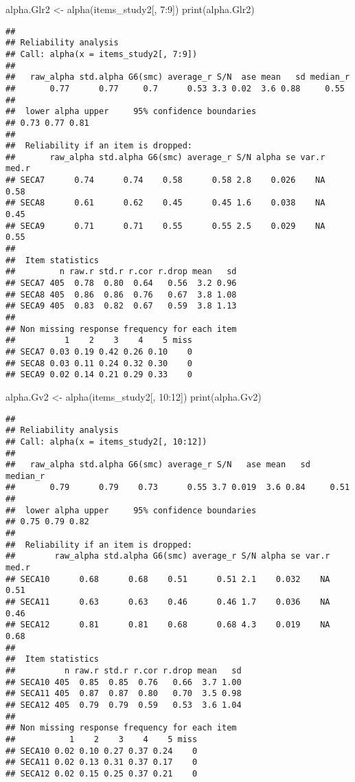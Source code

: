 \documentclass[
]{article}
\newenvironment{Shaded}{\begin{snugshade}}{\end{snugshade}}
\newcommand{\DecValTok}[1]{\textcolor[rgb]{0.00,0.00,0.81}{#1}}
\newcommand{\FunctionTok}[1]{\textcolor[rgb]{0.00,0.00,0.00}{#1}}
\newcommand{\NormalTok}[1]{#1}
\newcommand{\OtherTok}[1]{\textcolor[rgb]{0.56,0.35,0.01}{#1}}
\newcommand{\SpecialCharTok}[1]{\textcolor[rgb]{0.00,0.00,0.00}{#1}}
\begin{document}
\begin{Shaded}
\begin{Highlighting}[]
\NormalTok{alpha.Glr2 }\OtherTok{\textless{}{-}} \FunctionTok{alpha}\NormalTok{(items\_study2[, }\DecValTok{7}\SpecialCharTok{:}\DecValTok{9}\NormalTok{])}
\FunctionTok{print}\NormalTok{(alpha.Glr2)}
\end{Highlighting}
\end{Shaded}

\begin{verbatim}
## 
## Reliability analysis   
## Call: alpha(x = items_study2[, 7:9])
## 
##   raw_alpha std.alpha G6(smc) average_r S/N  ase mean   sd median_r
##       0.77      0.77     0.7      0.53 3.3 0.02  3.6 0.88     0.55
## 
##  lower alpha upper     95% confidence boundaries
## 0.73 0.77 0.81 
## 
##  Reliability if an item is dropped:
##       raw_alpha std.alpha G6(smc) average_r S/N alpha se var.r med.r
## SECA7      0.74      0.74    0.58      0.58 2.8    0.026    NA  0.58
## SECA8      0.61      0.62    0.45      0.45 1.6    0.038    NA  0.45
## SECA9      0.71      0.71    0.55      0.55 2.5    0.029    NA  0.55
## 
##  Item statistics 
##         n raw.r std.r r.cor r.drop mean   sd
## SECA7 405  0.78  0.80  0.64   0.56  3.2 0.96
## SECA8 405  0.86  0.86  0.76   0.67  3.8 1.08
## SECA9 405  0.83  0.82  0.67   0.59  3.8 1.13
## 
## Non missing response frequency for each item
##          1    2    3    4    5 miss
## SECA7 0.03 0.19 0.42 0.26 0.10    0
## SECA8 0.03 0.11 0.24 0.32 0.30    0
## SECA9 0.02 0.14 0.21 0.29 0.33    0
\end{verbatim}

\begin{Shaded}
\begin{Highlighting}[]
\NormalTok{alpha.Gv2 }\OtherTok{\textless{}{-}} \FunctionTok{alpha}\NormalTok{(items\_study2[, }\DecValTok{10}\SpecialCharTok{:}\DecValTok{12}\NormalTok{])}
\FunctionTok{print}\NormalTok{(alpha.Gv2)}
\end{Highlighting}
\end{Shaded}

\begin{verbatim}
## 
## Reliability analysis   
## Call: alpha(x = items_study2[, 10:12])
## 
##   raw_alpha std.alpha G6(smc) average_r S/N   ase mean   sd median_r
##       0.79      0.79    0.73      0.55 3.7 0.019  3.6 0.84     0.51
## 
##  lower alpha upper     95% confidence boundaries
## 0.75 0.79 0.82 
## 
##  Reliability if an item is dropped:
##        raw_alpha std.alpha G6(smc) average_r S/N alpha se var.r med.r
## SECA10      0.68      0.68    0.51      0.51 2.1    0.032    NA  0.51
## SECA11      0.63      0.63    0.46      0.46 1.7    0.036    NA  0.46
## SECA12      0.81      0.81    0.68      0.68 4.3    0.019    NA  0.68
## 
##  Item statistics 
##          n raw.r std.r r.cor r.drop mean   sd
## SECA10 405  0.85  0.85  0.76   0.66  3.7 1.00
## SECA11 405  0.87  0.87  0.80   0.70  3.5 0.98
## SECA12 405  0.79  0.79  0.59   0.53  3.6 1.04
## 
## Non missing response frequency for each item
##           1    2    3    4    5 miss
## SECA10 0.02 0.10 0.27 0.37 0.24    0
## SECA11 0.02 0.13 0.31 0.37 0.17    0
## SECA12 0.02 0.15 0.25 0.37 0.21    0
\end{verbatim}
\end{document}

